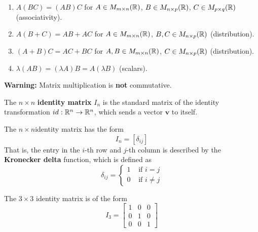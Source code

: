 \begin{theorem}
    
    \begin{enumerate}
        \item $A(BC) = (AB)C$ for $A \in M_{m \times n}(\mathbb{R})$, $B \in M_{n \times p}(\mathbb{R})$, $C \in M_{p \times q}(\mathbb{R})$ (associativity).
        \item $A (B + C) = AB + AC$ for $A \in M_{m \times n}(\mathbb{R})$, $B,C \in M_{n \times p}(\mathbb{R})$ (distribution).
        \item $(A + B) C = AC + BC$ for $A,B \in M_{m \times n}(\mathbb{R})$, $C \in M_{n \times p}(\mathbb{R})$ (distribution).
        \item $\lambda(AB) = (\lambda A) B = A (\lambda B)$ (scalars).
        
    \end{enumerate}
    
    \end{theorem}

\begin{example}
    \textbf{Warning:}  Matrix multiplication is \textbf{not} commutative.
\end{example}


\begin{definition}\label{identitymatrix}
    The $n \times n$ \textbf{identity matrix} $I_n$ is the standard matrix of the identity transformation $id : \mathbb{R}^n \to \mathbb{R}^n$, which sends a vector $\bm{v}$ to itself.
    
    The $n \times n$identity matrix has the form $$I_n = \left[\delta_{ij}\right]$$
    That is, the entry in the $i$-th row and $j$-th column is described by the \textbf{Kronecker delta} function, which is defined as $$\delta_{ij} = \left\{
		\begin{array}{ll}
			1 & \text{ if } i = j \\
			0 & \text{ if } i \neq j
		\end{array}
		\right.$$
    
\end{definition}

\begin{example}
    The $3 \times 3$ identity matrix is of the form  \begin{equation*}
I_3 = 
\begin{bmatrix}
1 & 0  & 0 \\
0 & 1  & 0 \\
0 & 0  & 1
\end{bmatrix}
\end{equation*}
\end{example}


